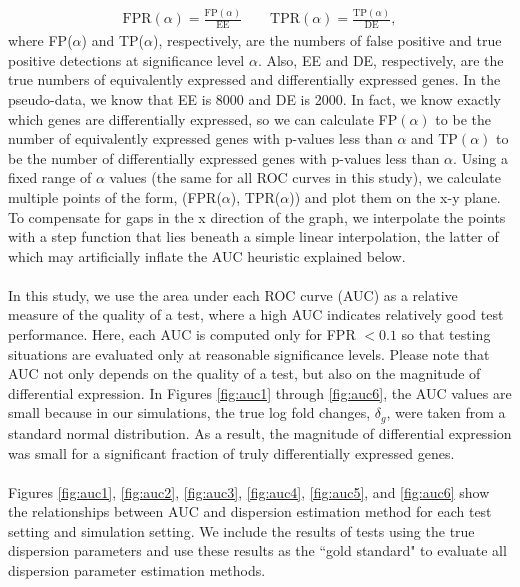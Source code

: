 \documentclass[10pt]{article}
\begin{document}
\begin{align*}
\text{FPR}(\alpha) = \frac{\text{FP}(\alpha)}{\text{EE}} \qquad \text{TPR}(\alpha) = \frac{\text{TP}(\alpha)}{\text{DE}},
\end{align*}
where FP($\alpha$) and TP($\alpha$), respectively, are the numbers of false positive and true positive detections at significance level $\alpha$. Also, EE and DE, respectively, are the true numbers of equivalently expressed and differentially expressed genes. In the pseudo-data, we know that EE is 8000 and DE is 2000. In fact, we know exactly which genes are differentially expressed, so we can calculate FP$(\alpha)$ to be the number of equivalently expressed genes with p-values less than $\alpha$ and TP$(\alpha)$ to be the number of differentially expressed genes with p-values less than $\alpha$. Using a fixed range of $\alpha$ values (the same for all ROC curves in this study), we calculate multiple points of the form, (FPR($\alpha$), TPR($\alpha$)) and plot them on the x-y plane. To compensate for gaps in the x direction of the graph, we interpolate the points with a step function that lies beneath a simple linear interpolation, the latter of which may artificially inflate the AUC heuristic explained below.

\paragraph{} 
In this study, we use the area under each ROC curve (AUC) as a relative measure of the quality of a test, where a high AUC indicates relatively good test performance. Here, each AUC is computed only for FPR $< 0.1$ so that testing situations are evaluated only at reasonable significance levels. Please note that AUC not only depends on the quality of a test, but also on the magnitude of differential expression. In Figures \ref{fig:auc1} through  \ref{fig:auc6}, the AUC values are small because in our simulations, the true log fold changes, $\delta_g$, were taken from a standard normal distribution. As a result, the magnitude of differential expression was small for a significant fraction of truly differentially expressed genes.






 \paragraph{} \indent Figures \ref{fig:auc1}, \ref{fig:auc2}, \ref{fig:auc3}, \ref{fig:auc4}, \ref{fig:auc5}, and \ref{fig:auc6} show the relationships between AUC and dispersion estimation method for each test setting and simulation setting. We include the results of tests using the true dispersion parameters and use these results as the ``gold standard" to evaluate all dispersion parameter estimation methods.
\end{document}
